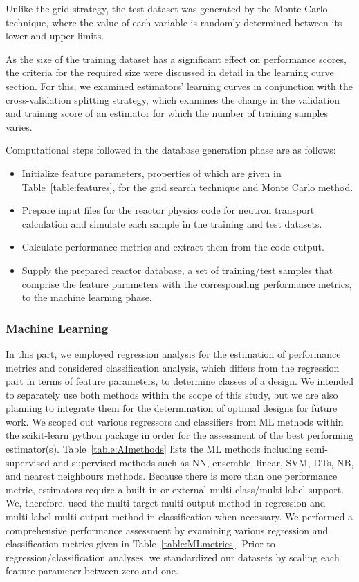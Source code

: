     Unlike the grid strategy, the test dataset was generated by the Monte Carlo technique, where the value of each variable is randomly determined between its lower and upper limits.

    As the size of the training dataset has a significant effect on performance scores, the criteria for the required size were discussed in detail in the learning curve section. For this, we examined estimators' learning curves in conjunction with the cross-validation splitting strategy, which examines the change in the validation and training score of an estimator for which the number of training samples varies.

    Computational steps followed in the database generation phase are as follows:
    \begin{itemize}
        \item Initialize feature parameters, properties of which are given in Table~\ref{table:features}, for the grid search technique and Monte Carlo method.
        \item Prepare input files for the reactor physics code for neutron transport calculation and simulate each sample in the training and test datasets.
        \item Calculate performance metrics and extract them from the code output.
        \item Supply the prepared reactor database, a set of training/test samples that comprise the feature parameters with the corresponding performance metrics, to the machine learning phase.
    \end{itemize}

\subsubsection{Machine Learning}

    In this part, we employed regression analysis for the estimation of performance metrics and considered classification analysis, which differs from the regression part in terms of feature parameters, to determine classes of a design. We intended to separately use both methods within the scope of this study, but we are also planning to integrate them for the determination of optimal designs for future work. We scoped out various regressors and classifiers from \gls{ML} methods within the scikit-learn python package \cite{Ped2011} in order for the assessment of the best performing estimator(s). Table~\ref{table:AImethods} lists the \gls{ML} methods including semi-supervised and supervised methods such as \gls{NN}, ensemble, linear, \gls{SVM}, \gls{DTs}, \gls{NB}, and nearest neighbours methods. Because there is more than one performance metric, estimators require a built-in or external multi-class/multi-label support. We, therefore, used the multi-target multi-output method in regression and multi-label multi-output method in classification when necessary. We performed a comprehensive performance assessment by examining various regression and classification metrics given in Table~\ref{table:MLmetrics}. Prior to regression/classification analyses, we standardized our datasets by scaling each feature parameter between zero and one.

